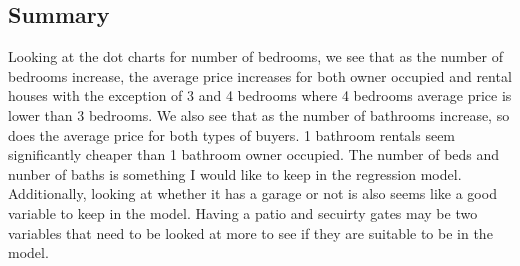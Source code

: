 \pagebreak
\subsection*{Summary}
Looking at the dot charts for number of bedrooms, we see that as the number of bedrooms increase,
the average price increases for both owner occupied and rental houses with the exception of 3 and 4 bedrooms where 
4 bedrooms average price is lower than 3 bedrooms. We also see that as the number of bathrooms increase, so does the average price
for both types of buyers. 1 bathroom rentals seem significantly cheaper than 1 bathroom owner occupied. The number of beds and nunber of baths 
is something I would like to keep in the regression model. Additionally, looking at whether it has a garage or not is also seems like a good variable to keep in the model.
Having a patio and secuirty gates may be two variables that need to be looked at more to see if they are suitable to be in the model. 


%
